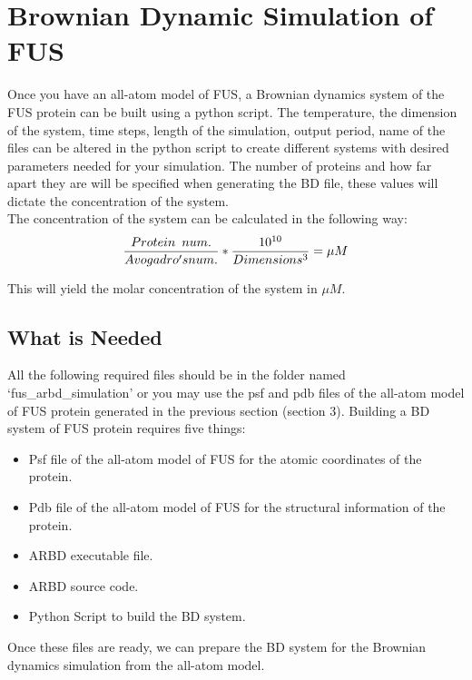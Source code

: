 \documentclass[letterpaper]{article}
\begin{document}
\newpage
\section{Brownian Dynamic Simulation of FUS}
Once you have an all-atom model of FUS, a Brownian dynamics system of the FUS protein can be built using a python script. The temperature, the dimension of the system, time steps, length of the simulation, output period, name of the files can be altered in the python script to create different systems with desired parameters needed for your simulation. The number of proteins and how far apart they are will be specified when generating the BD file, these values will dictate the concentration of the system. \\[0.02cm]

\noindent The concentration of the system can be calculated in the following way: 
\begin{equation*}
 \frac{Protein \\num.}{ Avogadro's \\ num.}  * \frac{10 ^ {10}}{Dimensions ^ {3}} = \mu M
\end{equation*}

\noindent This will yield the molar concentration of the system in $\mu M$.

\subsection{What is Needed}

All the following required files should be in the folder named `fus\_arbd\_simulation' or you may use the psf and pdb files of the all-atom model of FUS protein generated in the previous section (section 3). Building a BD system of FUS protein requires five things: 
\begin{itemize}
\item Psf file of the all-atom model of FUS for the atomic coordinates of the protein.
\item Pdb file of the all-atom model of FUS for the structural information of the protein.
\item ARBD executable file.
\item ARBD source code.
\item Python Script to build the BD system. 
\end{itemize}

\noindent Once these files are ready, we can prepare the BD system for the Brownian dynamics simulation from the all-atom model. 
\end{document}
